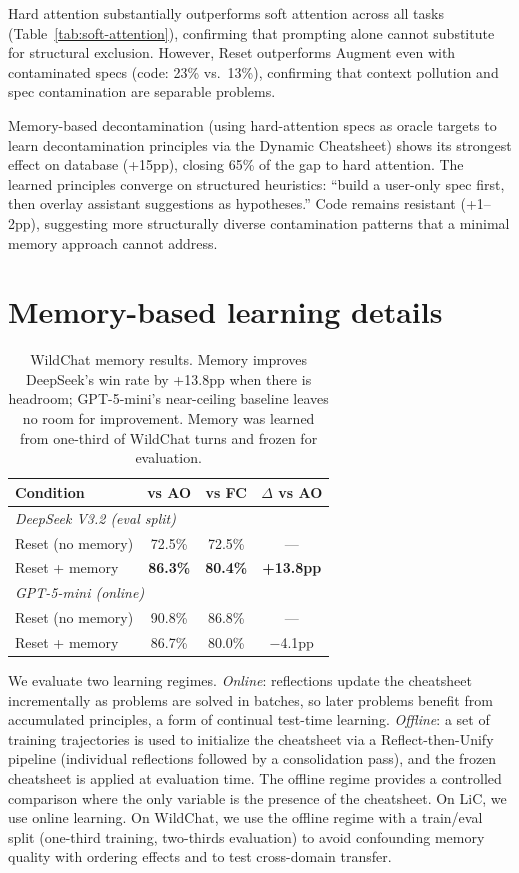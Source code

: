 \documentclass{article} %
\begin{document}
Hard attention substantially outperforms soft attention across all tasks (Table~\ref{tab:soft-attention}), confirming that prompting alone cannot substitute for structural exclusion. However, Reset outperforms Augment even with contaminated specs (code: 23\% vs.\ 13\%), confirming that context pollution and spec contamination are separable problems.

Memory-based decontamination (using hard-attention specs as oracle targets to learn decontamination principles via the Dynamic Cheatsheet) shows its strongest effect on database (+15pp), closing 65\% of the gap to hard attention. The learned principles converge on structured heuristics: ``build a user-only spec first, then overlay assistant suggestions as hypotheses.'' Code remains resistant (+1--2pp), suggesting more structurally diverse contamination patterns that a minimal memory approach cannot address.

\section{Memory-based learning details}
\label{app:memory-details}

\begin{table}[h]
\centering
\begin{tabular}{lccc}
\toprule
\textbf{Condition} & \textbf{vs AO} & \textbf{vs FC} & \textbf{$\Delta$ vs AO} \\
\midrule
\multicolumn{4}{l}{\emph{DeepSeek V3.2 (eval split)}} \\
\quad Reset (no memory) & 72.5\% & 72.5\% & --- \\
\quad Reset + memory & \textbf{86.3\%} & \textbf{80.4\%} & \textbf{+13.8pp} \\
\midrule
\multicolumn{4}{l}{\emph{GPT-5-mini (online)}} \\
\quad Reset (no memory) & 90.8\% & 86.8\% & --- \\
\quad Reset + memory & 86.7\% & 80.0\% & $-$4.1pp \\
\bottomrule
\end{tabular}
\caption{WildChat memory results. Memory improves DeepSeek's win rate by +13.8pp when there is headroom; GPT-5-mini's near-ceiling baseline leaves no room for improvement. Memory was learned from one-third of WildChat turns and frozen for evaluation.}
\label{tab:wildchat-memory}
\end{table}

We evaluate two learning regimes. \emph{Online}: reflections update the cheatsheet incrementally as problems are solved in batches, so later problems benefit from accumulated principles, a form of continual test-time learning. \emph{Offline}: a set of training trajectories is used to initialize the cheatsheet via a Reflect-then-Unify pipeline (individual reflections followed by a consolidation pass), and the frozen cheatsheet is applied at evaluation time. The offline regime provides a controlled comparison where the only variable is the presence of the cheatsheet. On LiC, we use online learning. On WildChat, we use the offline regime with a train/eval split (one-third training, two-thirds evaluation) to avoid confounding memory quality with ordering effects and to test cross-domain transfer.
\end{document}
